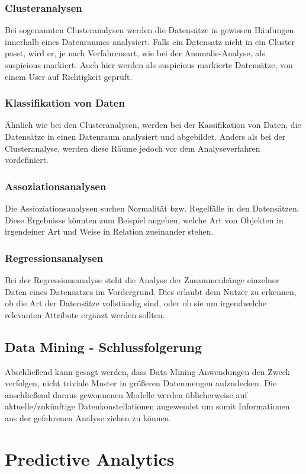 \documentclass[12pt,twocolumn,twoside]{conference}   %
\begin{document}
\subsubsection{Clusteranalysen}
Bei sogenannten Clusteranalysen werden die Datensätze in gewissen Häufungen innerhalb eines Datenraumes analysiert. Falls ein Datensatz nicht in ein Cluster passt, wird er, je nach Verfahrensart, wie bei der Anomalie-Analyse, als suspicious markiert. Auch hier werden als suspicious markierte Datensätze, von einem User auf Richtigkeit geprüft.

\subsubsection{Klassifikation von Daten}
Ähnlich wie bei den Clusteranalysen, werden bei der Kassifikation von Daten, die Datensätze in einen Datenraum analysiert und abgebildet. Anders als bei der Clusteranalyse, werden diese Räume jedoch vor dem Analyseverfahren vordefiniert. 

\subsubsection{Assoziationsanalysen}
Die Assioziationsanalysen suchen Normalität bzw. Regelfälle in den Datensätzen. Diese Ergebnisse könnten zum Beispiel angeben, welche Art von Objekten in irgendeiner Art und Weise in Relation zueinander stehen. 

\subsubsection{Regressionsanalysen}
Bei der Regressionsanalyse steht die Analyse der Zusammenhänge einzelner Daten eines Datensatzes im Vordergrund. Dies erlaubt dem Nutzer zu erkennen, ob die Art der Datensätze vollständig sind, oder ob sie um  irgendwelche relevanten Attribute ergänzt werden sollten.

\subsection{Data Mining - Schlussfolgerung}
Abschließend kann gesagt werden, dass Data Mining Anwendungen den Zweck verfolgen, nicht triviale Muster in größeren Datenmengen aufzudecken. Die anschließend daraus gewonnenen Modelle werden üblicherweise auf aktuelle/zukünftige Datenkonstellationen angewendet um somit Informationen aus der gefahrenen Analyse ziehen zu können.

\section{Predictive Analytics}
\end{document}
